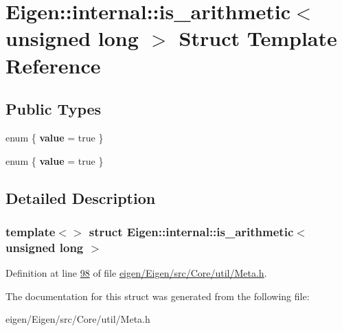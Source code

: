 \hypertarget{struct_eigen_1_1internal_1_1is__arithmetic_3_01unsigned_01long_01_4}{}\section{Eigen\+:\+:internal\+:\+:is\+\_\+arithmetic$<$ unsigned long $>$ Struct Template Reference}
\label{struct_eigen_1_1internal_1_1is__arithmetic_3_01unsigned_01long_01_4}
\subsection*{Public Types}
\begin{DoxyCompactItemize}
\item 
\mbox{\label{struct_eigen_1_1internal_1_1is__arithmetic_3_01unsigned_01long_01_4_a70341ad0bc970eaa3769bc79fbd41d67}} 
enum \{ {\bfseries value} = true
 \}
\item 
\mbox{\label{struct_eigen_1_1internal_1_1is__arithmetic_3_01unsigned_01long_01_4_a125b5c78414b6841bd773087c0533920}} 
enum \{ {\bfseries value} = true
 \}
\end{DoxyCompactItemize}


\subsection{Detailed Description}
\subsubsection*{template$<$$>$\newline
struct Eigen\+::internal\+::is\+\_\+arithmetic$<$ unsigned long $>$}



Definition at line \hyperlink{eigen_2_eigen_2src_2_core_2util_2_meta_8h_source_l00098}{98} of file \hyperlink{eigen_2_eigen_2src_2_core_2util_2_meta_8h_source}{eigen/\+Eigen/src/\+Core/util/\+Meta.\+h}.



The documentation for this struct was generated from the following file\+:\begin{DoxyCompactItemize}
\item 
eigen/\+Eigen/src/\+Core/util/\+Meta.\+h\end{DoxyCompactItemize}
